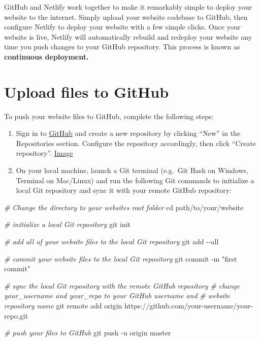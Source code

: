 \documentclass[
]{book}
\newenvironment{Shaded}{\begin{snugshade}}{\end{snugshade}}
\newcommand{\AttributeTok}[1]{\textcolor[rgb]{0.77,0.63,0.00}{#1}}
\newcommand{\BuiltInTok}[1]{#1}
\newcommand{\CommentTok}[1]{\textcolor[rgb]{0.56,0.35,0.01}{\textit{#1}}}
\newcommand{\FunctionTok}[1]{\textcolor[rgb]{0.00,0.00,0.00}{#1}}
\newcommand{\NormalTok}[1]{#1}
\newcommand{\StringTok}[1]{\textcolor[rgb]{0.31,0.60,0.02}{#1}}
\begin{document}
GitHub and Netlify work together to make it remarkably simple to deploy your website to the internet. Simply upload your website codebase to GitHub, then configure Netlify to deploy your website with a few simple clicks. Once your website is live, Netlify will automatically rebuild and redeploy your website any time you push changes to your GitHub repository. This process is known as \textbf{continuous deployment.}

\hypertarget{initial-push}{%
\section{Upload files to GitHub}\label{initial-push}}

To push your website files to GitHub, complete the following steps:

\begin{enumerate}
\def\labelenumi{\arabic{enumi}.}
\item
  Sign in to \href{https://github.com/}{GitHub} and create a new repository by clicking ``New'' in the Repositories section. Configure the repository accordingly, then click ``Create repository''. \href{https://i.imgur.com/dnmI973.png}{Image}
\item
  On your local machine, launch a Git terminal (e.g.~Git Bash on Windows, Terminal on Mac/Linux) and run the following Git commands to initialize a local Git repository and sync it with your remote GitHub repository:
\end{enumerate}

\begin{Shaded}
\begin{Highlighting}[]
\CommentTok{\# Change the directory to your website\textquotesingle{}s root folder}
\BuiltInTok{cd}\NormalTok{ path/to/your/website}

\CommentTok{\# initialize a local Git repository}
\FunctionTok{git}\NormalTok{ init}

\CommentTok{\# add all of your website files to the local Git repository}
\FunctionTok{git}\NormalTok{ add }\AttributeTok{{-}{-}all}

\CommentTok{\# commit your website files to the local Git repository}
\FunctionTok{git}\NormalTok{ commit }\AttributeTok{{-}m} \StringTok{"first commit"}

\CommentTok{\# sync the local Git repository with the remote GitHub repository}
\CommentTok{\# change your\_username and your\_repo to your GitHub username and }
\CommentTok{\# website repository name}
\FunctionTok{git}\NormalTok{ remote add origin https://github.com/your{-}username/your{-}repo.git}

\CommentTok{\# push your files to GitHub}
\FunctionTok{git}\NormalTok{ push }\AttributeTok{{-}u}\NormalTok{ origin master}
\end{Highlighting}
\end{Shaded}
\end{document}
